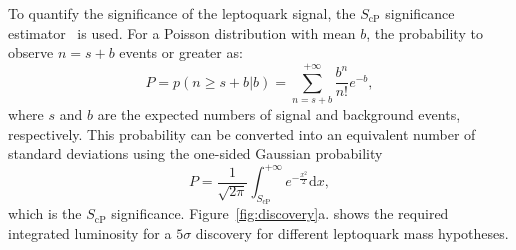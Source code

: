\documentclass{cmspaper}
\begin{document}
\begin{linenumbers}
To quantify the significance of the
leptoquark signal, the 
$S_\text{cP}$ significance estimator~\cite{ref:scp} is used.  
For a Poisson distribution
with mean $b$,
the probability to observe $n=s+b$ events or greater as:
\begin{equation}
P = p(n\geq s+b|b) = \sum_{n=s+b}^{+\infty} \frac{b^n}{n!}e^{-b},
\end{equation}
where $s$ and $b$ are the expected numbers of signal and background events, respectively. This probability can be
converted into an equivalent number of standard deviations using the one-sided Gaussian probability
\begin{equation}
P = \frac{1}{\sqrt{2\pi}}\int_{S_\text{cP}}^{+\infty} e^{-\frac{x^2}{2}}\mathrm{d}x,
\label{eq:ScP}
\end{equation}
which is the $S_\text{cP}$ significance.
Figure~\ref{fig:discovery}a. shows the required integrated luminosity
for a $5\sigma$ discovery for different leptoquark mass hypotheses. 


\end{linenumbers}
\end{document}
